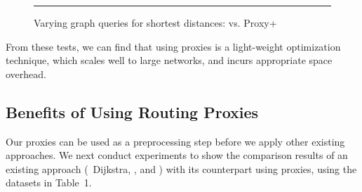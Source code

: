 {\begin{figure}[t!]
\begin{center}
\end{center}
\caption{Varying graph queries  for shortest distances: \ah vs. Proxy+\ah}
\hrule
\label{fig:performance_dist_queries_ah}
\vspace{-2ex}
\end{figure}
}

From these tests, we can find that using proxies is a light-weight optimization technique, which scales well to large networks, and incurs appropriate space overhead. %

\subsection{Benefits of Using Routing Proxies}
Our proxies can be used as a preprocessing step before we apply other existing approaches.
We next conduct experiments to show the comparison results of an existing approach (\ie \ Dijkstra, \arcflag, \tnr and \ah) with its counterpart using proxies, using the datasets in Table~1.



